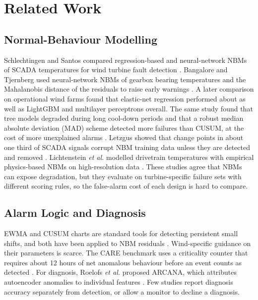 \documentclass[conference]{IEEEtran}
\begin{document}
\section{Related Work}
\subsection{Normal-Behaviour Modelling}
Schlechtingen and Santos compared regression-based and neural-network NBMs of SCADA temperatures for wind turbine fault detection \cite{schlechtingen2011comparative}. Bangalore and Tjernberg used neural-network NBMs of gearbox bearing temperatures and the Mahalanobis distance of the residuals to raise early warnings \cite{bangalore2015ann}. A later comparison on operational wind farms found that elastic-net regression performed about as well as LightGBM and multilayer perceptrons overall. The same study found that tree models degraded during long cool-down periods and that a robust median absolute deviation (MAD) scheme detected more failures than CUSUM, at the cost of more unexplained alarms \cite{chesterman2023nbm}. Letzgus showed that change points in about one third of SCADA signals corrupt NBM training data unless they are detected and removed \cite{letzgus2020change}. Lichtenstein \emph{et al.} modelled drivetrain temperatures with empirical physics-based NBMs on high-resolution data \cite{lichtenstein2025physics}. These studies agree that NBMs can expose degradation, but they evaluate on turbine-specific failure sets with different scoring rules, so the false-alarm cost of each design is hard to compare.

\subsection{Alarm Logic and Diagnosis}
EWMA \cite{roberts1959ewma,lucas1990ewma} and CUSUM \cite{page1954cusum} charts are standard tools for detecting persistent small shifts, and both have been applied to NBM residuals \cite{chesterman2023nbm}. Wind-specific guidance on their parameters is scarce. The CARE benchmark uses a criticality counter that requires about 12 hours of net anomalous behaviour before an event counts as detected \cite{gueck2024care}. For diagnosis, Roelofs \emph{et al.} proposed ARCANA, which attributes autoencoder anomalies to individual features \cite{roelofs2021arcana}. Few studies report diagnosis accuracy separately from detection, or allow a monitor to decline a diagnosis.
\end{document}
